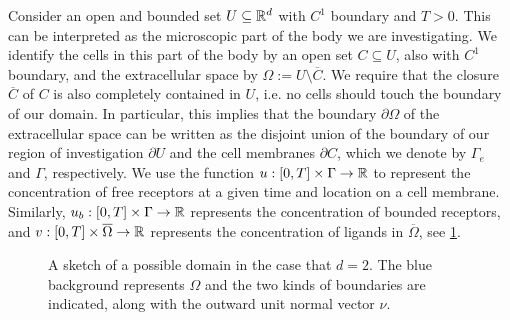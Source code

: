 Consider an open and bounded set $U \subseteq \mathbb{R}^d$ with $C^1$ boundary and $T > 0$. This can be interpreted as the microscopic part of the body we are investigating. We identify the cells in this part of the body by an open set $C \subseteq U$, also with $C^1$ boundary, and the extracellular space by $\Omega := U \setminus \overline{C}$. We require that the closure $\overline{C}$ of $C$ is also completely contained in $U$, i.e. no cells should touch the boundary of our domain. In particular, this implies that the boundary $\partial \Omega$ of the extracellular space can be written as the disjoint union of the boundary of our region of investigation $\partial U$ and the cell membranes $\partial C$, which we denote by $\Gamma_{e}$ and $\Gamma$, respectively. We use the function $u: [0, T] \times \Gamma \to \mathbb{R}$ to represent the concentration of free receptors at a given time and location on a cell membrane. Similarly, $u_b: [0, T] \times \Gamma \to \mathbb{R}$ represents the concentration of bounded receptors, and $v: [0, T] \times \overline{\Omega} \to \mathbb{R}$ represents the concentration of ligands in $\overline{\Omega}$, see \cref{fig:domain}.

\begin{figure}[!t]
    \centering
    \caption{A sketch of a possible domain in the case that $d= 2$. The blue background represents $\Omega$ and the two kinds of boundaries are indicated, along with the outward unit normal vector $\nu$.}
    \label{fig:domain}
\end{figure}


